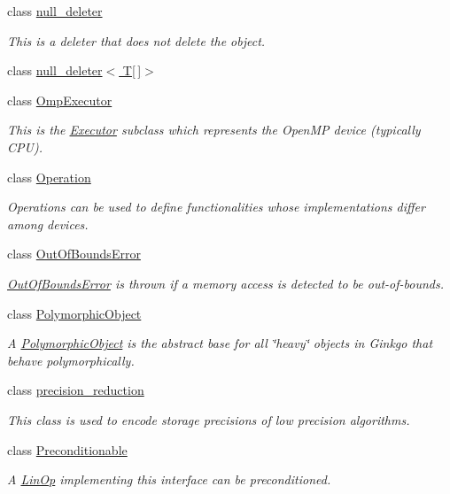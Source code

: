 \begin{DoxyCompactItemize}
class \hyperlink{classgko_1_1null__deleter}{null\+\_\+deleter}
\begin{DoxyCompactList}\small\item\em This is a deleter that does not delete the object. \end{DoxyCompactList}\item 
class \hyperlink{classgko_1_1null__deleter_3_01T[]_4}{null\+\_\+deleter$<$ T\mbox{[}$\,$\mbox{]}$>$}
\item 
class \hyperlink{classgko_1_1OmpExecutor}{Omp\+Executor}
\begin{DoxyCompactList}\small\item\em This is the \hyperlink{classgko_1_1Executor}{Executor} subclass which represents the Open\+MP device (typically C\+PU). \end{DoxyCompactList}\item 
class \hyperlink{classgko_1_1Operation}{Operation}
\begin{DoxyCompactList}\small\item\em Operations can be used to define functionalities whose implementations differ among devices. \end{DoxyCompactList}\item 
class \hyperlink{classgko_1_1OutOfBoundsError}{Out\+Of\+Bounds\+Error}
\begin{DoxyCompactList}\small\item\em \hyperlink{classgko_1_1OutOfBoundsError}{Out\+Of\+Bounds\+Error} is thrown if a memory access is detected to be out-\/of-\/bounds. \end{DoxyCompactList}\item 
class \hyperlink{classgko_1_1PolymorphicObject}{Polymorphic\+Object}
\begin{DoxyCompactList}\small\item\em A \hyperlink{classgko_1_1PolymorphicObject}{Polymorphic\+Object} is the abstract base for all \char`\"{}heavy\char`\"{} objects in Ginkgo that behave polymorphically. \end{DoxyCompactList}\item 
class \hyperlink{classgko_1_1precision__reduction}{precision\+\_\+reduction}
\begin{DoxyCompactList}\small\item\em This class is used to encode storage precisions of low precision algorithms. \end{DoxyCompactList}\item 
class \hyperlink{classgko_1_1Preconditionable}{Preconditionable}
\begin{DoxyCompactList}\small\item\em A \hyperlink{classgko_1_1LinOp}{Lin\+Op} implementing this interface can be preconditioned. \end{DoxyCompactList}\item 

\end{DoxyCompactItemize}
